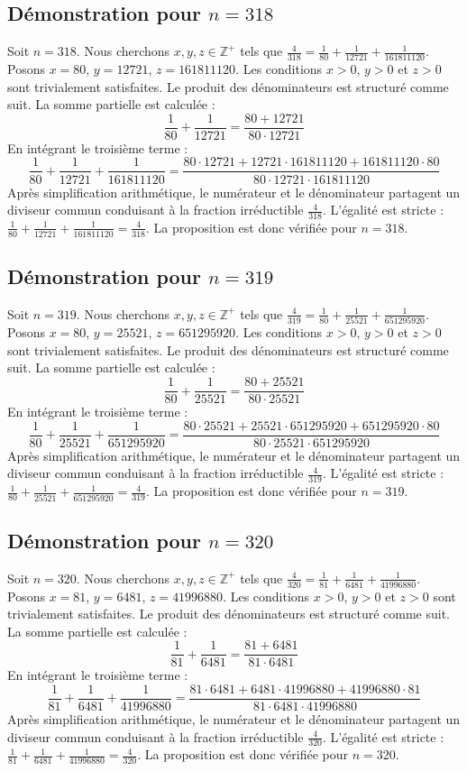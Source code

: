 \documentclass[11pt,a4paper]{article}
\begin{document}
\subsection{Démonstration pour $n = 318$}
Soit $n = 318$. Nous cherchons $x, y, z \in \mathbb{Z}^{+}$ tels que $\frac{4}{318} = \frac{1}{80} + \frac{1}{12721} + \frac{1}{161811120}$.
Posons $x = 80$, $y = 12721$, $z = 161811120$.
Les conditions $x > 0$, $y > 0$ et $z > 0$ sont trivialement satisfaites.
Le produit des dénominateurs est structuré comme suit. La somme partielle est calculée :
$$ \frac{1}{80} + \frac{1}{12721} = \frac{80+12721}{80 \cdot 12721} $$
En intégrant le troisième terme :
$$ \frac{1}{80} + \frac{1}{12721} + \frac{1}{161811120} = \frac{80 \cdot 12721 + 12721 \cdot 161811120 + 161811120 \cdot 80}{80 \cdot 12721 \cdot 161811120} $$
Après simplification arithmétique, le numérateur et le dénominateur partagent un diviseur commun conduisant à la fraction irréductible $\frac{4}{318}$.
L'égalité est stricte : $\frac{1}{80} + \frac{1}{12721} + \frac{1}{161811120} = \frac{4}{318}$.
La proposition est donc vérifiée pour $n = 318$.
\subsection{Démonstration pour $n = 319$}
Soit $n = 319$. Nous cherchons $x, y, z \in \mathbb{Z}^{+}$ tels que $\frac{4}{319} = \frac{1}{80} + \frac{1}{25521} + \frac{1}{651295920}$.
Posons $x = 80$, $y = 25521$, $z = 651295920$.
Les conditions $x > 0$, $y > 0$ et $z > 0$ sont trivialement satisfaites.
Le produit des dénominateurs est structuré comme suit. La somme partielle est calculée :
$$ \frac{1}{80} + \frac{1}{25521} = \frac{80+25521}{80 \cdot 25521} $$
En intégrant le troisième terme :
$$ \frac{1}{80} + \frac{1}{25521} + \frac{1}{651295920} = \frac{80 \cdot 25521 + 25521 \cdot 651295920 + 651295920 \cdot 80}{80 \cdot 25521 \cdot 651295920} $$
Après simplification arithmétique, le numérateur et le dénominateur partagent un diviseur commun conduisant à la fraction irréductible $\frac{4}{319}$.
L'égalité est stricte : $\frac{1}{80} + \frac{1}{25521} + \frac{1}{651295920} = \frac{4}{319}$.
La proposition est donc vérifiée pour $n = 319$.
\subsection{Démonstration pour $n = 320$}
Soit $n = 320$. Nous cherchons $x, y, z \in \mathbb{Z}^{+}$ tels que $\frac{4}{320} = \frac{1}{81} + \frac{1}{6481} + \frac{1}{41996880}$.
Posons $x = 81$, $y = 6481$, $z = 41996880$.
Les conditions $x > 0$, $y > 0$ et $z > 0$ sont trivialement satisfaites.
Le produit des dénominateurs est structuré comme suit. La somme partielle est calculée :
$$ \frac{1}{81} + \frac{1}{6481} = \frac{81+6481}{81 \cdot 6481} $$
En intégrant le troisième terme :
$$ \frac{1}{81} + \frac{1}{6481} + \frac{1}{41996880} = \frac{81 \cdot 6481 + 6481 \cdot 41996880 + 41996880 \cdot 81}{81 \cdot 6481 \cdot 41996880} $$
Après simplification arithmétique, le numérateur et le dénominateur partagent un diviseur commun conduisant à la fraction irréductible $\frac{4}{320}$.
L'égalité est stricte : $\frac{1}{81} + \frac{1}{6481} + \frac{1}{41996880} = \frac{4}{320}$.
La proposition est donc vérifiée pour $n = 320$.
\end{document}

